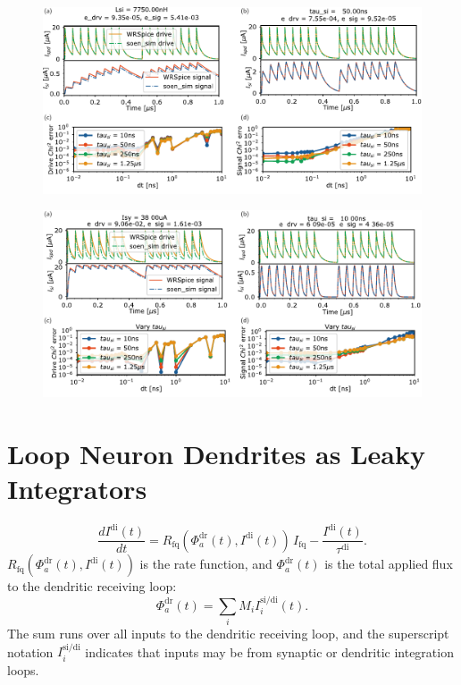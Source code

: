 \documentclass[twocolumn]{article}
\begin{document}
\begin{figure}[h!]
\includegraphics[width=17.2cm]{figures/_fig__synapses__comparison__1jj__main.pdf}
\end{figure}

\begin{figure}[h!]
\includegraphics[width=17.2cm]{figures/_fig__synapses__comparison__3jj__main.pdf}
\end{figure}

\cite{amfu1994,fudr2005,fuab2007}

\section{\label{sec:dendrites}Loop Neuron Dendrites as Leaky Integrators}

\begin{equation}
\label{eq:dendrites__leaky_integrator}
\frac{dI^{\mathrm{di}}(t)}{dt} = R_{\mathrm{fq}} \left( \Phi^{\mathrm{dr}}_a(t),I^{\mathrm{di}}(t) \right)\,I_{\mathrm{fq}} - \frac{I^{\mathrm{di}}(t)}{\tau^{\mathrm{di}}}.
\end{equation}
$R_{\mathrm{fq}} \left( \Phi^{\mathrm{dr}}_a(t),I^{\mathrm{di}}(t) \right)$ is the rate function, and $\Phi^{\mathrm{dr}}_a(t)$ is the total applied flux to the dendritic receiving loop:
\begin{equation}
\label{eq:dendrites__applied_flux}
\Phi^{\mathrm{dr}}_a(t) = \sum_i M_i I_i^{\mathrm{si/di}}(t).
\end{equation}
The sum runs over all inputs to the dendritic receiving loop, and the superscript notation $I_i^{\mathrm{si/di}}$ indicates that inputs may be from synaptic or dendritic integration loops.
\end{document}

